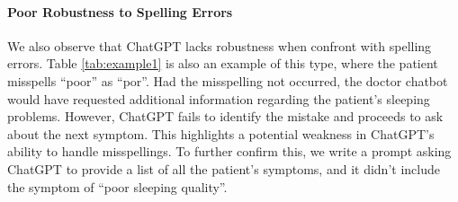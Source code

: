\paragraph{Poor Robustness to Spelling Errors} We also observe that ChatGPT lacks robustness when confront with spelling errors. Table \ref{tab:example1} is also an example of this type, where the patient misspells ``poor'' as ``por''. Had the misspelling not occurred, the doctor chatbot would have requested additional information regarding the patient's sleeping problems. However, ChatGPT fails to identify the mistake and proceeds to ask about the next symptom. This highlights a potential weakness in ChatGPT's ability to handle misspellings.
To further confirm this, we write a prompt asking ChatGPT to provide a list of all the patient's symptoms, and it didn't include the symptom of ``poor sleeping quality''.

